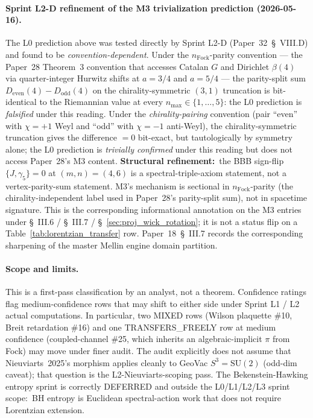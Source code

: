\documentclass[11pt]{article}
\begin{document}
\paragraph{Sprint L2-D refinement of the M3 trivialization prediction
(2026-05-16).}
The L0 prediction above was tested directly by Sprint L2-D
(Paper~32~\S~VIII.D) and found to be
\emph{convention-dependent}.  Under the
$n_{\mathrm{Fock}}$-parity convention --- the Paper~28 Theorem~3
convention that accesses Catalan $G$ and Dirichlet $\beta(4)$ via
quarter-integer Hurwitz shifts at $a = 3/4$ and $a = 5/4$ --- the
parity-split sum $D_{\mathrm{even}}(4) - D_{\mathrm{odd}}(4)$ on the
chirality-symmetric $(3, 1)$ truncation is bit-identical to the
Riemannian value at every $n_{\max} \in \{1, \ldots, 5\}$: the L0
prediction is \emph{falsified} under this reading.  Under the
\emph{chirality-pairing} convention (pair ``even'' with $\chi = +1$
Weyl and ``odd'' with $\chi = -1$ anti-Weyl), the chirality-symmetric
truncation gives the difference $= 0$ bit-exact, but tautologically
by symmetry alone; the L0 prediction is \emph{trivially confirmed}
under this reading but does not access Paper~28's M3 content.
\textbf{Structural refinement:}\ the BBB sign-flip
$\{J, \gamma_5\} = 0$ at $(m, n) = (4, 6)$ is a
spectral-triple-axiom statement, not a vertex-parity-sum statement.
M3's mechanism is sectional in $n_{\mathrm{Fock}}$-parity (the chirality-independent
label used in Paper~28's parity-split sum), not in spacetime
signature.  This is the corresponding informational annotation on the
M3 entries under \S~III.6 / \S~III.7 / \S~\ref{sec:proj_wick_rotation};
it is not a status flip on a Table~\ref{tab:lorentzian_transfer} row.
Paper~18~\S~III.7 records the corresponding sharpening of the master
Mellin engine domain partition.

\paragraph{Scope and limits.}
This is a first-pass classification by an analyst, not a theorem.
Confidence ratings flag medium-confidence rows that may shift to
either side under Sprint L1 / L2 actual computations.  In particular,
two MIXED rows (Wilson plaquette \#10, Breit retardation \#16) and
one TRANSFERS\_FREELY row at medium confidence (coupled-channel
\#25, which inherits an algebraic-implicit $\pi$ from Fock) may
move under finer audit.  The audit explicitly does not assume that
Nieuviarts~2025's morphism applies cleanly to GeoVac
$S^3 = \mathrm{SU}(2)$ (odd-dim caveat); that question is the
L2-Nieuviarts-scoping pass.  The Bekenstein-Hawking entropy sprint is
correctly DEFERRED and outside the L0/L1/L2/L3 sprint scope:\ BH
entropy is Euclidean spectral-action work that does not require
Lorentzian extension.
\end{document}
